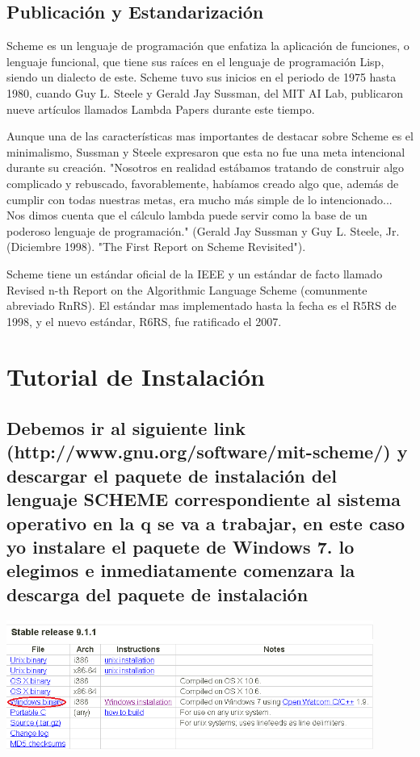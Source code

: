\documentclass[11pt]{article} %
\begin{document}
\subsection{Publicación y Estandarización}

Scheme es un lenguaje de programación que enfatiza la aplicación de funciones, o lenguaje funcional, que tiene sus raíces en el lenguaje de programación Lisp, siendo un dialecto de este. Scheme tuvo sus inicios en el periodo de 1975 hasta 1980, cuando Guy L. Steele y Gerald Jay Sussman, del MIT AI Lab, publicaron nueve artículos llamados Lambda Papers durante este tiempo.

Aunque una de las características mas importantes de destacar sobre Scheme es el minimalismo, Sussman y Steele expresaron que esta no fue una meta intencional durante su creación. "Nosotros en realidad estábamos tratando de construir algo complicado y rebuscado, favorablemente, habíamos creado algo que, además de cumplir con todas nuestras metas, era mucho más simple de lo intencionado... Nos dimos cuenta que el cálculo lambda puede servir como la base de un poderoso lenguaje de programación." (Gerald Jay Sussman y Guy L. Steele, Jr. (Diciembre 1998). "The First Report on Scheme Revisited").

Scheme tiene un estándar oficial de la IEEE y un estándar de facto llamado Revised n-th Report on the Algorithmic Language Scheme (comunmente abreviado RnRS). El estándar mas implementado hasta la fecha es el R5RS de 1998, y el nuevo estándar, R6RS, fue ratificado el 2007.
\section{Tutorial de Instalación}
\subsection{Debemos ir al siguiente link (http://www.gnu.org/software/mit-scheme/) y descargar el paquete de instalación del lenguaje SCHEME correspondiente al sistema operativo en la q se va a trabajar, en este caso yo instalare el paquete de Windows 7.
lo elegimos e inmediatamente comenzara la descarga del paquete de instalación}
\begin{center}
\includegraphics[width=12cm]{imagenes/1.png}
\end{center}
\end{document}
